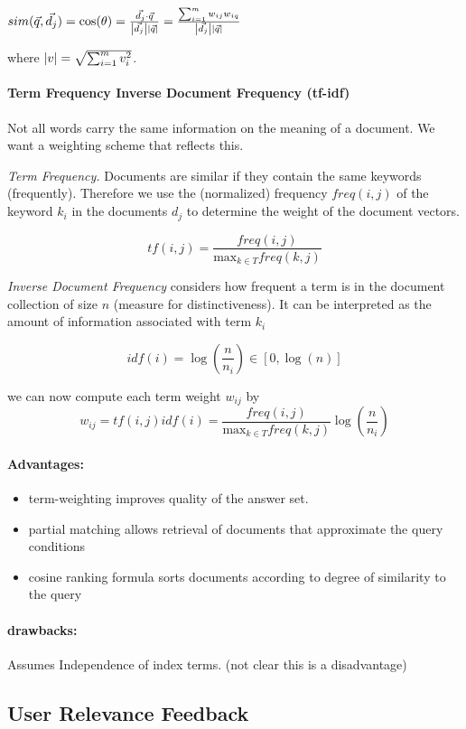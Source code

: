 $sim(\vec{q}, \vec{d_j}) = \cos(\theta)= \frac{\vec{d_j} \cdot \vec{q}}{\left| \vec{d_j} \right|\left| \vec{q} \right|}= \frac{\sum_{i=1}^m w_{ij}w_{iq}}{\left| \vec{d_j} \right|\left| \vec{q} \right|}$


where $\left| v \right| = \sqrt{\sum_{i=1}^m v_i^2}$.

\paragraph{Term Frequency Inverse Document Frequency (tf-idf)} Not all words carry the same information on the meaning of a document. We want a weighting scheme that reflects this.

\textit{Term Frequency.} Documents are similar if they contain the same keywords (frequently). Therefore we use the (normalized) frequency $freq(i,j)$ of the keyword $k_i$ in the documents $d_j$ to determine the weight of the document vectors.

\[tf(i,j) = \frac{freq(i,j)}{\text{max}_{k \in T}freq(k,j)}\]

\textit{Inverse Document Frequency} considers how frequent a term is in the document collection of size $n$ (measure for distinctiveness). It can be interpreted as the amount of information associated with term $k_i$

\[idf(i)= \log(\frac{n}{n_i}) \in [0,\log(n)]\]

we can now compute each term weight $w_{ij}$ by
\[w_{ij} = tf(i,j)idf(i) = \frac{freq(i,j)}{\text{max}_{k \in T}freq(k,j)} \log(\frac{n}{n_i})\]


\paragraph{Advantages:}
\begin{itemize}
\item term-weighting improves quality of the answer set. 
\item partial matching allows retrieval of documents that approximate the query conditions
\item cosine ranking formula sorts documents according to degree of similarity to the query
\end{itemize} 
\paragraph{drawbacks:} Assumes Independence of index terms. (not clear this is a disadvantage)
\subsection{User Relevance Feedback}

